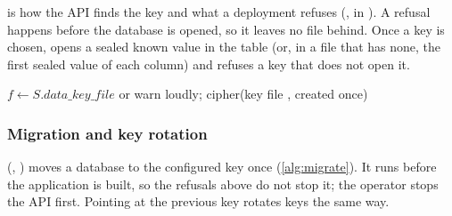  is how the API finds the key and what a deployment refuses (,
 in ). A refusal happens before the database is opened, so it leaves no
file behind. Once a key is chosen,  opens a sealed known value in the  table (or, in a
file that has none, the first sealed value of each column) and refuses a key that does not open it.

\begin{algorithm}[htbp]
  \caption{Choosing the data key (\texttt{resolve} and \texttt{check}).}\label{alg:keys}
  $f \gets S.\mathit{data\_key\_file}$ or \;
  warn loudly; \Return cipher(key file , created once) 
\end{algorithm}

\subsubsection{Migration and key rotation}

 (, )
moves a database to the configured key once (\cref{alg:migrate}). It runs before the application is built, so the
refusals above do not stop it; the operator stops the API first. Pointing  at the previous key
rotates keys the same way.

